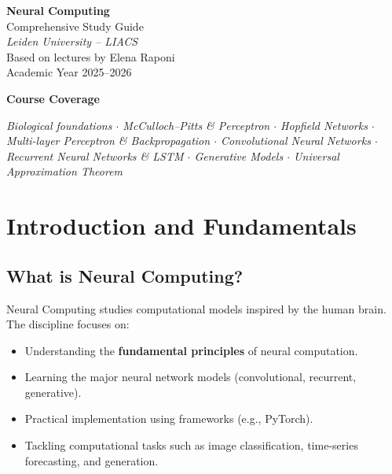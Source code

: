\documentclass[11pt,a4paper]{article}
\begin{document}
\thispagestyle{empty}

\begin{center}
\vspace*{0.5cm}
{\color{leidenblue}\Huge\bfseries Neural Computing}\\[0.5em]
{\color{leidenlight}\Large Comprehensive Study Guide}\\[0.3em]
{\large \textit{Leiden University -- LIACS}}\\[0.5em]
{\normalsize Based on lectures by Elena Raponi}\\[0.2em]
{\normalsize Academic Year 2025--2026}

\vspace{1.5cm}

\begin{tcolorbox}[colback=boxgray, colframe=leidenblue, width=\textwidth, arc=3mm]
\centering
\textbf{Course Coverage}
\smallskip

\textit{Biological foundations $\cdot$ McCulloch--Pitts \& Perceptron $\cdot$ Hopfield Networks $\cdot$
Multi-layer Perceptron \& Backpropagation $\cdot$ Convolutional Neural Networks $\cdot$
Recurrent Neural Networks \& LSTM $\cdot$ Generative Models $\cdot$ Universal Approximation Theorem}
\end{tcolorbox}
\end{center}

\newpage

\section{Introduction and Fundamentals}

\subsection{What is Neural Computing?}

Neural Computing studies computational models inspired by the human brain. The discipline focuses on:
\begin{itemize}[leftmargin=*]
    \item Understanding the \textbf{fundamental principles} of neural computation.
    \item Learning the major neural network models (convolutional, recurrent, generative).
    \item Practical implementation using frameworks (e.g., PyTorch).
    \item Tackling computational tasks such as image classification, time-series forecasting, and generation.
\end{itemize}
\end{document}
